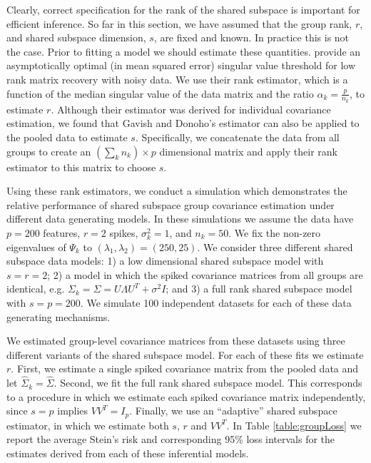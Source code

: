 \documentclass{statsoc}
\begin{document}
Clearly, correct specification for the rank of the shared subspace is
important for efficient inference.  So far in this section, we have
assumed that the group rank, $r$, and shared subspace dimension, $s$,
are fixed and known.  In practice this is not the case.  Prior to
fitting a model we should estimate these quantities.
\citet{Gavish2014} provide an asymptotically optimal (in mean squared
error) singular value threshold for low rank matrix recovery with
noisy data.  We use their rank estimator, which is a function of the
median singular value of the data matrix and the ratio
$\alpha_k =\frac{p}{n_k}$, to estimate $r$.  Although their estimator
was derived for individual covariance estimation, we found that Gavish
and Donoho's estimator can also be applied to the pooled data to
estimate $s$.  Specifically, we concatenate the data from all groups
to create an $(\sum_k n_k) \times p$ dimensional matrix and apply
their rank estimator to this matrix to choose $s$.

Using these rank estimators, we conduct a simulation which
demonstrates the relative performance of shared subspace group
covariance estimation under different data generating models.  In
these simulations we assume the data have $p=200$ features, $r=2$
spikes, $\sigma^2_k=1$, and $n_k = 50$.  We fix the non-zero eigenvalues of
$\Psi_k$ to $(\lambda_1, \lambda_2) = (250, 25)$.  We consider three
different shared subspace data models: 1) a low dimensional shared
subspace model with $s=r=2$; 2) a model in which the spiked covariance
matrices from all groups are identical, e.g.
$\Sigma_k = \Sigma = U\Lambda U^T + \sigma^2I$; and 3) a full rank
shared subspace model with $s=p=200$.  We simulate 100 independent
datasets for each of these data generating mechanisms.

We estimated group-level covariance matrices from these datasets using three different variants of the shared
subspace model.  For each of these fits we estimate $r$.  First, we
estimate a single spiked covariance matrix from the pooled data and
let $\hat{\Sigma}_k = \hat{\Sigma}$.  Second, we fit the full rank
shared subspace model.  This corresponds to a procedure in which we
estimate each spiked covariance matrix independently, since $s=p$
implies $VV^T = I_p$.  Finally, we use an ``adaptive'' shared subspace
estimator, in which we estimate both $s$, $r$ and $VV^T$.  In Table
\ref{table:groupLoss} we report the average Stein's risk and
corresponding 95\% loss intervals for the estimates derived from each
of these inferential models.
\end{document}
